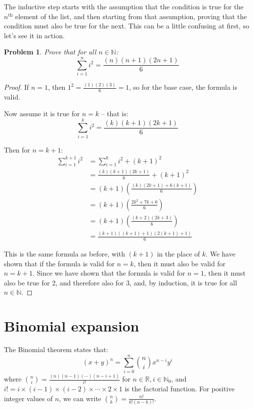 \documentclass{article}
\newtheorem*{problem}{Problem}
\begin{document}
The inductive step starts with the assumption that the condition is true for the
$n^\text{th}$ element of the list, and then starting from that assumption, proving
that the condition must also be true for the next. This can be a little confusing at
first, so let's see it in action.

\begin{problem} Prove that for all $n \in \mathbb{N}$:
	\[ \sum_{i=1}^{n} i^2 = \frac{(n)(n+1)(2n+1)}{6} \]
\end{problem}

\begin{proof}
	If $n = 1$, then $1^2 = \frac{(1)(2)(3)}{6} = 1$, so for the base case, the formula is valid.

	Now assume it is true for $n=k$ -- that is:
	\[ \sum_{i=1}^{k} i^2 = \frac{(k)(k+1)(2k+1)}{6} \]

	Then for $n=k+1$:
	\begin{align*}
		\sum_{i=1}^{k+1} i^2 &= \sum_{i=1}^{k} i^2 + (k+1)^2 \\
		 &= \frac{(k)(k+1)(2k+1)}{6} + (k+1)^2 \\
		 &= \left(k+1\right)\left(\frac{(k)(2k+1) + 6(k+1)}{6}\right) \\
		 &= \left(k+1\right)\left(\frac{2k^2 +7k +6}{6}\right) \\
		 &= \left(k+1\right)\left(\frac{(k+2)(2k+3)}{6}\right) \\
		 &= \frac{(k+1)((k+1)+1)(2(k+1)+1)}{6}
	\end{align*}
	
	This is the same formula as before, with $(k+1)$ in the place of $k$. We have
	shown that if the formula is valid for $n=k$, then it must also be valid for
	$n=k+1$. Since we have shown that the formula is valid for $n=1$, then it must also
	be true for 2, and therefore also for 3, and, by induction, it is true for all
	$n \in \mathbb{N}$.
\end{proof}

\section{Binomial expansion}

The Binomial theorem states that:
\[ (x + y)^n = \sum_{i=0}^{n} \binom{n}{i}x^{n-i}y^{i} \]
where $\binom{n}{i} = \frac{(n)(n-1)(\cdots)(n-i+1)}{i!}$ for 
$n \in \mathbb{R}, i \in \mathbb{N}_0$, and $i! = i\times(i-1)\times (i-2)\times \cdots 
\times 2 \times 1$ is the factorial function. For positive integer values of $n$, we can
write $\binom{n}{k} = \frac{n!}{k!(n-k)!}$.
\end{document}
